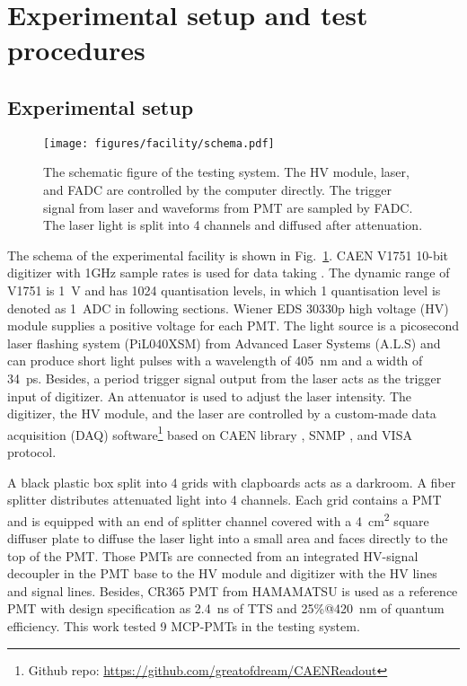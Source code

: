 \section{Experimental setup and test procedures}
\label{SetUp}
\subsection{Experimental setup}
\label{sec:setup}
\begin{figure}[!htbp]
    \centering
    \texttt{[image: figures/facility/schema.pdf]}
    \caption{The schematic figure of the testing system. The HV module, laser, and FADC are controlled by the computer directly. The trigger signal from laser and waveforms from PMT are sampled by FADC. The laser light is split into 4 channels and diffused after attenuation.}
    \label{fig:facility}
\end{figure}

The schema of the experimental facility is shown in Fig.~\ref{fig:facility}. CAEN V1751 10-bit digitizer with 1GHz sample rates is used for data taking \cite{CAENV1751}. The dynamic range of V1751 is \SI{1}{V} and has 1024 quantisation levels, in which 1 quantisation level is denoted as \SI{1}{ADC} in following sections. Wiener EDS 30330p high voltage (HV) module \cite{WIENERHV} supplies a positive voltage for each PMT. The light source is a picosecond laser flashing system (PiL040XSM) from Advanced Laser Systems (A.L.S) \cite{NTKLaser} and can produce short light pulses with a wavelength of \SI{405}{nm} and a width of \SI{34}{ps}. Besides, a period trigger signal output from the laser acts as the trigger input of digitizer. An attenuator is used to adjust the laser intensity. The digitizer, the HV module, and the laser are controlled by a custom-made data acquisition (DAQ) software\footnote{Github repo: \url{https://github.com/greatofdream/CAENReadout}} based on CAEN library \cite{CAENLIB}, SNMP \cite{SNMP}, and VISA \cite{VISA} protocol.

A black plastic box split into 4 grids with clapboards acts as a darkroom. A fiber splitter distributes attenuated light into 4 channels. Each grid contains a PMT and is equipped with an end of splitter channel covered with a \SI{4}{cm\tothe{2}} square diffuser plate to diffuse the laser light into a small area and faces directly to the top of the PMT. Those PMTs are connected from an integrated HV-signal decoupler in the PMT base to the HV module and digitizer with the HV lines and signal lines. Besides, CR365 PMT \cite{BJBS} from HAMAMATSU is used as a reference PMT with design specification as \SI{2.4}{ns} of TTS and 25\%@\SI{420}{nm} of quantum efficiency. This work tested 9 MCP-PMTs in the testing system.

